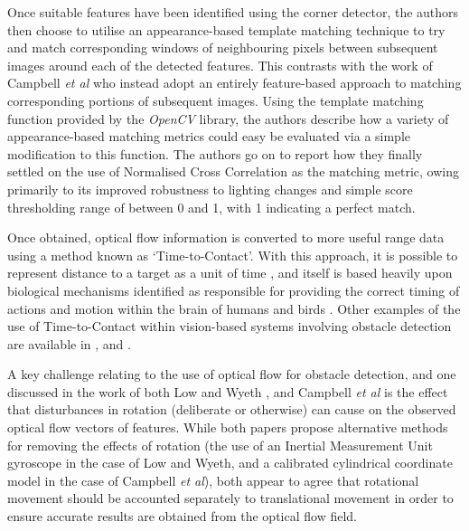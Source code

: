 Once suitable features have been identified using the corner detector, the authors then choose to utilise an appearance-based template matching technique to try and match corresponding windows of neighbouring pixels between subsequent images around each of the detected features. This contrasts with the work of Campbell \textit{et al} \cite{campbell} who instead adopt an entirely feature-based approach to matching corresponding portions of subsequent images. Using the template matching function provided by the \textit{OpenCV} library, the authors describe how a variety of appearance-based matching metrics could easy be evaluated via a simple modification to this function. The authors go on to report how they finally settled on the use of Normalised Cross Correlation as the matching metric, owing primarily to its improved robustness to lighting changes and simple score thresholding range of between 0 and 1, with 1 indicating a perfect match. 

Once obtained, optical flow information is converted to more useful range data using a method known as `Time-to-Contact'. With this approach, it is possible to represent distance to a target as a unit of time \cite{alenya}, and itself is based heavily upon biological mechanisms identified as responsible for providing the correct timing of actions and motion within the brain of humans and birds \cite{lee-young}. Other examples of the use of Time-to-Contact within vision-based systems involving obstacle detection are available in \cite{alenya}, \cite{sagrebin} and \cite{thomas}.


A key challenge relating to the use of optical flow for obstacle detection, and one discussed in the work of both Low and Wyeth \cite{low-wyeth}, and Campbell \textit{et al} \cite{low-wyeth} is the effect that disturbances in rotation (deliberate or otherwise) can cause on the observed optical flow vectors of features. While both papers propose alternative methods for removing the effects of rotation (the use of an Inertial Measurement Unit gyroscope in the case of Low and Wyeth, and a calibrated cylindrical coordinate model in the case of Campbell \textit{et al}), both appear to agree that rotational movement should be accounted separately to translational movement in order to ensure accurate results are obtained from the optical flow field. 

